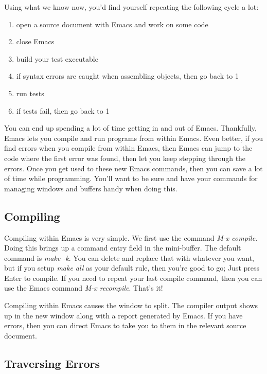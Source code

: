 \documentclass[]{tufte-handout}
\begin{document}
Using what we know now, you'd find yourself repeating the following cycle a lot: 
\begin{enumerate}
\item open a source document with Emacs and work on some code
\item close Emacs
\item build your test executable
\item if syntax errors are caught when assembling objects, then go back to 1
\item run tests
\item if tests fail, then go back to 1
\end{enumerate}
You can end up spending a lot of time getting in and out of Emacs. Thankfully, Emacs lets you compile and run programs from within Emacs. Even better, if you find errors when you compile from within Emacs, then Emacs can jump to the code where the first error was found, then let you keep stepping through the errors.  Once you get used to these new Emacs commands, then you can save a lot of time while programming. You'll want to be sure and have your commands for managing windows and buffers handy when doing this.

\subsection{Compiling}

Compiling within Emacs is very simple. We first use the command \textit{M-x compile}. Doing this brings up a command entry field in the mini-buffer. The default command is \textit{make -k}.  You can delete and replace that with whatever you want, but if you setup \textit{make all} as your default rule, then you're good to go; Just press Enter to compile.  If you need to repeat your last compile command, then you can use the Emacs command \textit{M-x recompile}. That's it!

Compiling within Emacs causes the window to split. The compiler output shows up in the new window along with a report generated by Emacs.  If you have errors, then you can direct Emacs to take you to them in the relevant source document.   

\subsection{Traversing Errors}
\end{document}
